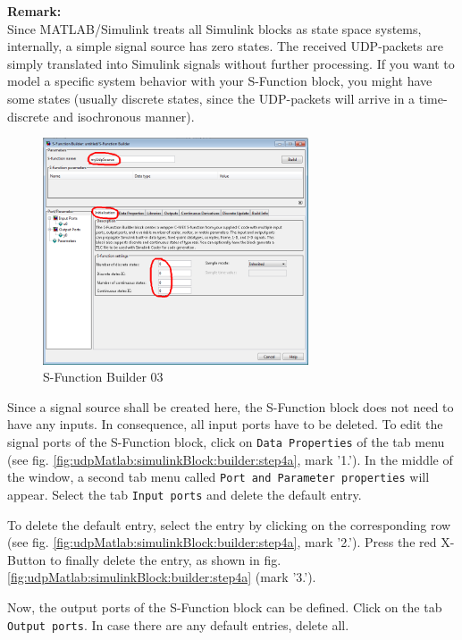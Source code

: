 \textbf{Remark:}\\
Since MATLAB/Simulink treats all Simulink blocks as state space systems, internally, a simple signal source has zero states. The received UDP-packets are simply translated into Simulink signals without further processing. If you want to model a specific system behavior with your S-Function block, you might have some states (usually discrete states, since the UDP-packets will arrive in a time-discrete and isochronous manner).

\begin{figure}[H]
    \centering
    \includegraphics[width=0.7\textwidth]{fig/ch-matlab-lib/sFuncBuilder_matlabBuilder_00}
    \caption{S-Function Builder 03}
    \label{fig:udpMatlab:simulinkBlock:builder:step3}
\end{figure}

Since a signal source shall be created here, the S-Function block does not need to have any inputs. In consequence, all input ports have to be deleted. To edit the signal ports of the S-Function block, click on \texttt{Data Properties} of the tab menu (see fig. \ref{fig:udpMatlab:simulinkBlock:builder:step4a}, mark '1.'). In the middle of the window, a second tab menu called \texttt{Port and Parameter properties} will appear. Select the tab \texttt{Input ports} and delete the default entry.

To delete the default entry, select the entry by clicking on the corresponding row (see fig. \ref{fig:udpMatlab:simulinkBlock:builder:step4a}, mark '2.'). Press the red X-Button to finally delete the entry, as shown in fig. \ref{fig:udpMatlab:simulinkBlock:builder:step4a} (mark '3.').

Now, the output ports of the S-Function block can be defined. Click on the tab \texttt{Output ports}. In case there are any default entries, delete all.

